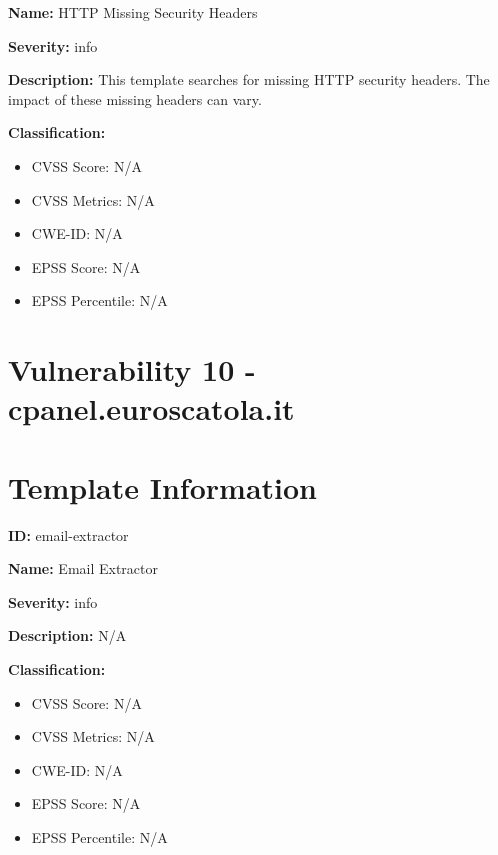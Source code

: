 \textbf{Name:} HTTP Missing Security Headers

\textbf{Severity:} info

\textbf{Description:} This template searches for missing HTTP security headers. The impact of these missing headers can vary.


\textbf{Classification:}
\begin{itemize}
\item CVSS Score: N/A
\item CVSS Metrics: N/A
\item CWE-ID: N/A
\item EPSS Score: N/A
\item EPSS Percentile: N/A
\end{itemize}



\section*{Vulnerability 10 - cpanel.euroscatola.it}

\section*{Template Information}
\textbf{ID:} email-extractor

\textbf{Name:} Email Extractor

\textbf{Severity:} info

\textbf{Description:} N/A

\textbf{Classification:}
\begin{itemize}
\item CVSS Score: N/A
\item CVSS Metrics: N/A
\item CWE-ID: N/A
\item EPSS Score: N/A
\item EPSS Percentile: N/A
\end{itemize}



